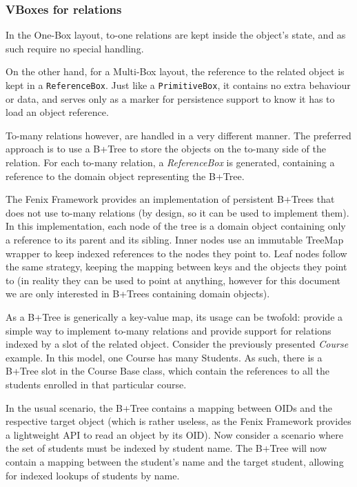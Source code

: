 \documentclass{llncs}
\begin{document}
\subsubsection{VBoxes for relations}

In the One-Box layout, to-one relations are kept inside the object's
state, and as such require no special handling. 

On the other hand, for a Multi-Box layout, the reference to the
related object is kept in a \texttt{ReferenceBox}. Just like a
\texttt{PrimitiveBox}, it contains no extra behaviour or data, and
serves only as a marker for persistence support to know it has to load
an object reference.

To-many relations however, are handled in a very different manner. The
preferred approach is to use a B+Tree \cite{elmasri2009fundamentals}
to store the objects on the to-many side of the relation. For each
to-many relation, a {\it ReferenceBox} is generated, containing a
reference to the domain object representing the B+Tree.

The Fenix Framework provides an implementation of persistent B+Trees
that does not use to-many relations (by design, so it can be used to
implement them). In this implementation, each node of the tree is a
domain object containing only a reference to its parent and its
sibling. Inner nodes use an immutable TreeMap wrapper to keep indexed
references to the nodes they point to. Leaf nodes follow the same
strategy, keeping the mapping between keys and the objects they point
to (in reality they can be used to point at anything, however for this
document we are only interested in B+Trees containing domain objects).

As a B+Tree is generically a key-value map, its usage can be twofold:
provide a simple way to implement to-many relations and provide
support for relations indexed by a slot of the related
object. Consider the previously presented {\it Course} example. In
this model, one Course has many Students. As such, there is a B+Tree
slot in the Course Base class, which contain the references to all the
students enrolled in that particular course.

In the usual scenario, the B+Tree contains a mapping between OIDs and
the respective target object (which is rather useless, as the Fenix
Framework provides a lightweight API to read an object by its OID).
Now consider a scenario where the set of students must be indexed by
student name. The B+Tree will now contain a mapping between the
student's name and the target student, allowing for indexed lookups of
students by name.
\end{document}

